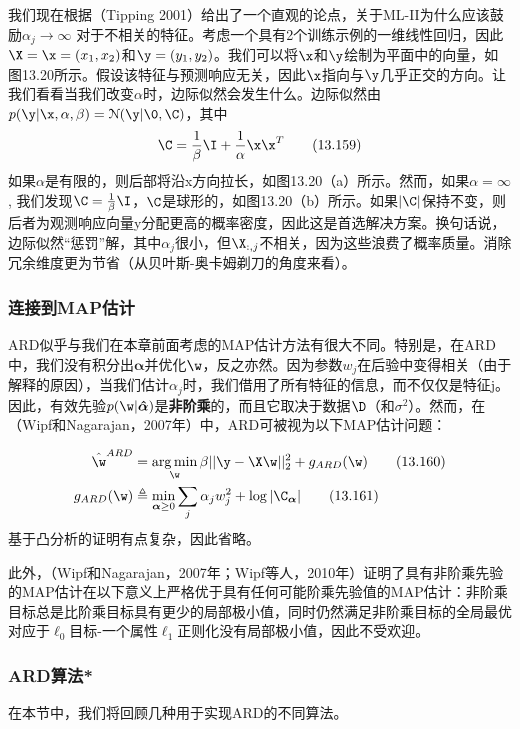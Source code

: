\documentclass[a4paper]{article}
\DeclareMathOperator*{\argmin}{arg\,min}
\begin{document}
我们现在根据（Tipping 2001）给出了一个直观的论点，关于ML-II为什么应该鼓励$\alpha_j\to \infty$ 对于不相关的特征。考虑一个具有2个训练示例的一维线性回归，因此$\X=\x=(x_1,x_2)$和$\y=(y_1,y_2)$。我们可以将$\x$和$\y$绘制为平面中的向量，如图13.20所示。假设该特征与预测响应无关，因此$\x$指向与$\y$几乎正交的方向。让我们看看当我们改变$\alpha$时，边际似然会发生什么。边际似然由$p(\y|\x,\alpha,\beta)=\mathcal{N}(\y|\0,\C)$，其中
\begin{equation}
	\C=\frac{1}{\beta}\I+\frac{1}{\alpha}\x\x^T\tag{13.159}
\end{equation}
如果$\alpha$是有限的，则后部将沿x方向拉长，如图13.20（a）所示。然而，如果$\alpha=\infty$, 我们发现$\C=\frac{1}{\beta}\I$，$\C$是球形的，如图13.20（b）所示。如果$|\C|$保持不变，则后者为观测响应向量y分配更高的概率密度，因此这是首选解决方案。换句话说，边际似然“惩罚”解，其中$\alpha_j$很小，但$\X_{:,j}$不相关，因为这些浪费了概率质量。消除冗余维度更为节省（从贝叶斯-奥卡姆剃刀的角度来看）。

\subsubsection{连接到MAP估计}
ARD似乎与我们在本章前面考虑的MAP估计方法有很大不同。特别是，在ARD中，我们没有积分出$\boldsymbol{\alpha}$并优化$\w$，反之亦然。因为参数$w_j$在后验中变得相关（由于解释的原因），当我们估计$\alpha_j$时，我们借用了所有特征的信息，而不仅仅是特征j。因此，有效先验$p(\w|\boldsymbol{\hat{\alpha}})$是\textbf{非阶乘}的，而且它取决于数据$\D$（和$\sigma^2$）。然而，在（Wipf和Nagarajan，2007年）中，ARD可被视为以下MAP估计问题：

\begin{align}
	\hat{\w}^{ARD}&=\argmin_\w \beta||\y-\X\w||_2^2+g_{ARD}(\w)\tag{13.160}\\
	g_{ARD}(\w)&\triangleq \min_{\boldsymbol{\alpha}\ge 0}\sum_{j}\alpha_jw_j^2+\log |\C_{\boldsymbol{\alpha}}|\tag{13.161}
\end{align}
基于凸分析的证明有点复杂，因此省略。

此外，（Wipf和Nagarajan，2007年；Wipf等人，2010年）证明了具有非阶乘先验的MAP估计在以下意义上严格优于具有任何可能阶乘先验值的MAP估计：非阶乘目标总是比阶乘目标具有更少的局部极小值，同时仍然满足非阶乘目标的全局最优对应于$\ell_0$目标-一个属性$\ell_1$正则化没有局部极小值，因此不受欢迎。

\subsubsection{ARD算法*}
在本节中，我们将回顾几种用于实现ARD的不同算法。
\end{document}
